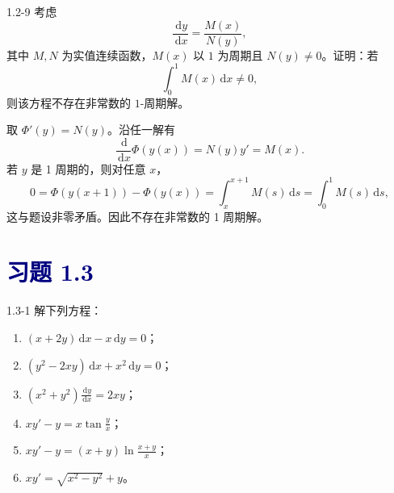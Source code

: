\documentclass[UTF8,a4paper,11pt]{ctexart}
\newcommand{\dd}{\,\mathrm d}
\newcommand{\sect}[1]{\section*{\textcolor{navy}{习题 #1}}}
\begin{document}
\begin{problem}{1.2-9}
考虑
  \[
    \frac{\dd y}{\dd x}=\frac{M(x)}{N(y)},
  \]
  其中 $M,N$ 为实值连续函数，$M(x)$ 以 $1$ 为周期且 $N(y)\ne0$。证明：若
  \[
    \int_0^1M(x)\dd x\ne0,
  \]
  则该方程不存在非常数的 $1$-周期解。
\end{problem}

\begin{solution}
取 $\Phi'(y)=N(y)$。沿任一解有
\[
\frac{\dd}{\dd x}\Phi(y(x))=N(y)y'=M(x).
\]
若 $y$ 是 1 周期的，则对任意 $x$，
\[
0=\Phi(y(x+1))-\Phi(y(x))=\int_x^{x+1}M(s)\dd s=\int_0^1M(s)\dd s,
\]
这与题设非零矛盾。因此不存在非常数的 1 周期解。
\end{solution}


\sect{1.3}
\begin{problem}{1.3-1}
解下列方程：
  \begin{enumerate}[label=(\arabic*)]
    \item $\displaystyle (x+2y)\dd x-x\dd y=0$；
    \item $\displaystyle (y^2-2xy)\dd x+x^2\dd y=0$；
    \item $\displaystyle (x^2+y^2)\frac{\dd y}{\dd x}=2xy$；
    \item $\displaystyle xy'-y=x\tan\frac{y}{x}$；
    \item $\displaystyle xy'-y=(x+y)\ln\frac{x+y}{x}$；
    \item $\displaystyle xy'=\sqrt{x^2-y^2}+y$。
  \end{enumerate}
\end{problem}
\end{document}
